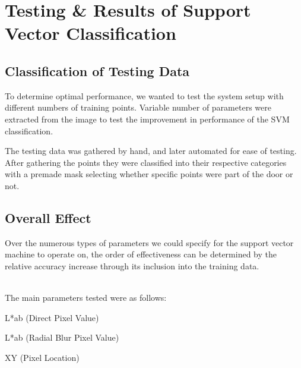 \chapter {Testing \& Results of Support Vector Classification}

\section{Classification of Testing Data}
To determine optimal performance, we wanted to test the system setup with different numbers of training points. Variable number of parameters were extracted from the image to test the improvement in performance of the SVM classification.

The testing data was gathered by hand, and later automated for ease of testing. After gathering the points they were classified into their respective categories with a premade mask selecting whether specific points were part of the door or not.

\section{Overall Effect}

Over the numerous types of parameters we could specify for the support vector machine to operate on, the order of effectiveness can be determined by the relative accuracy increase through its inclusion into the training data.

\\
The main parameters tested were as follows:

\begin{description}
  \item L*ab (Direct Pixel Value)
  \item L*ab (Radial Blur Pixel Value)
  \item XY (Pixel Location)
\end{description}


